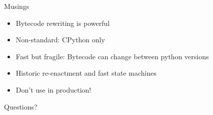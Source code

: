 \documentclass{beamer}
\begin{document}


%
%
%
%

\begin{frame}[fragile]{Musings}

\begin{itemize}
    \item Bytecode rewriting is powerful
    \item Non-standard: CPython only
    \item Fast but fragile: Bytecode can change between python versions
    \item Historic re-enactment and fast state machines
    \item Don't use in production!
\end{itemize}
Questions?%

\end{frame}
\end{document}
